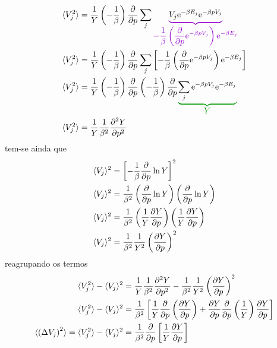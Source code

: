 \begin{prob}
\begin{sol}
\begin{enumerate}[label=\alph *)]
\begin{align}
\begin{split}
          \langle V_j^2\rangle&=\frac{1}{Y}\left(-\frac{1}{\beta}\right)\parder{}{p}\sum_j
          \color{mauve}{%
          \underbrace{%
            \color{black}{%
              V_j\E^{-\beta E_j}\E^{-\beta pV_j}
            }
          }_{\displaystyle-\frac{1}{\beta}\left(\parder{}{p}\E^{-\beta pV_j}\right)\E^{-\beta E_j}}
        }\\
          \langle V_j^2\rangle&=\frac{1}{Y}\left(-\frac{1}{\beta}\right)\parder{}{p}\sum_j\left[-\frac{1}{\beta}\left(\parder{}{p}\E^{-\beta pV_j}\right)\E^{-\beta E_j}\right]\\
          \langle V_j^2\rangle&=\frac{1}{Y}\left(-\frac{1}{\beta}\right)\parder{}{p}\left(-\frac{1}{\beta}\right)\parder{}{p}
          \color{dkgreen}{%
          \underbrace{%
            \color{black}{%
              \sum_j\E^{-\beta pV_j}\E^{-\beta E_j}
            }
          }_{\displaystyle Y}
        }\\  
        \langle V_j^2\rangle&=\frac{1}{Y}\frac{1}{\beta^2}\parder{^2Y}{p^2}
        \end{split}
      \end{align}
      tem-se ainda que
      \begin{align}
        \begin{split}
          \langle V_j\rangle^2&=\left[-\frac{1}{\beta}\frac{\partial {}}{\partial {p}}\ln Y\right]^2\\
          \langle V_j\rangle^2&=\frac{1}{\beta^2}\left(\frac{\partial {}}{\partial {p}}\ln Y\right)\left(\frac{\partial {}}{\partial {p}}\ln Y\right)\\
          \langle V_j\rangle^2&=\frac{1}{\beta^2}\left(\frac{1}{Y}\frac{\partial {Y}}{\partial {p}}\right)\left(\frac{1}{Y}\frac{\partial {Y}}{\partial {p}}\right)\\
          \langle V_j\rangle^2&=\frac{1}{\beta^2}\frac{1}{Y^2}\left(\frac{\partial {Y}}{\partial {p}}\right)^2
        \end{split}
      \end{align}
      reagrupando os termos
      \begin{align}
        \begin{split}
          \langle V_j^2 \rangle-\langle V_j \rangle^2&=\frac{1}{Y}\frac{1}{\beta^2}\parder{^2Y}{p^2}-\frac{1}{\beta^2}\frac{1}{Y^2}\left(\parder{Y}{p}\right)^2\\
          \langle V_j^2 \rangle-\langle V_j \rangle^2&=\frac{1}{\beta^2}\left[\frac{1}{Y}\parder{}{p}\left(\parder{Y}{p}\right)+\parder{Y}{p}\parder{}{p}\left(\frac{1}{Y}\right)\parder{Y}{p}\right]\\
          \langle \left(\Delta V_j\right)^2\rangle=\langle V_j^2 \rangle-\langle V_j \rangle^2&=\frac{1}{\beta^2}\parder{}{p}\left[\frac{1}{Y}\parder{Y}{p}\right]      

\end{split}
\end{align}
\end{enumerate}
\end{sol}
\end{prob}
